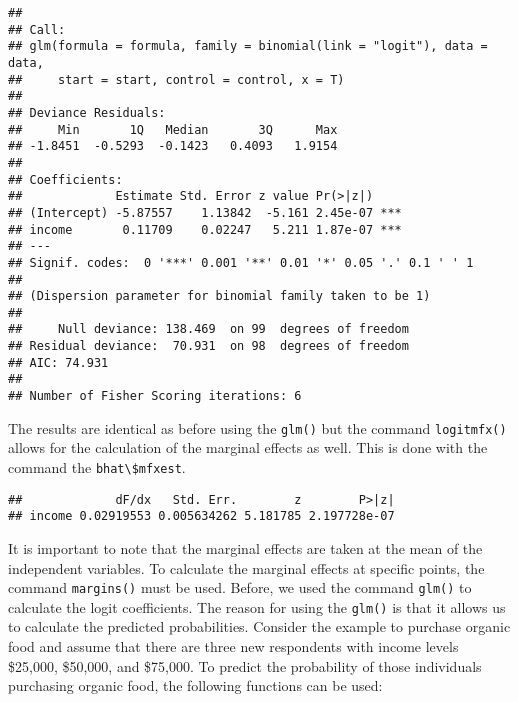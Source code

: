 \documentclass[
]{article}
\newenvironment{Shaded}{\begin{snugshade}}{\end{snugshade}}
\newcommand{\DataTypeTok}[1]{\textcolor[rgb]{0.13,0.29,0.53}{#1}}
\newcommand{\KeywordTok}[1]{\textcolor[rgb]{0.13,0.29,0.53}{\textbf{#1}}}
\newcommand{\NormalTok}[1]{#1}
\newcommand{\OperatorTok}[1]{\textcolor[rgb]{0.81,0.36,0.00}{\textbf{#1}}}
\newcommand{\StringTok}[1]{\textcolor[rgb]{0.31,0.60,0.02}{#1}}
\begin{document}
\begin{Shaded}
\end{Shaded}

\begin{verbatim}
## 
## Call:
## glm(formula = formula, family = binomial(link = "logit"), data = data, 
##     start = start, control = control, x = T)
## 
## Deviance Residuals: 
##     Min       1Q   Median       3Q      Max  
## -1.8451  -0.5293  -0.1423   0.4093   1.9154  
## 
## Coefficients:
##             Estimate Std. Error z value Pr(>|z|)    
## (Intercept) -5.87557    1.13842  -5.161 2.45e-07 ***
## income       0.11709    0.02247   5.211 1.87e-07 ***
## ---
## Signif. codes:  0 '***' 0.001 '**' 0.01 '*' 0.05 '.' 0.1 ' ' 1
## 
## (Dispersion parameter for binomial family taken to be 1)
## 
##     Null deviance: 138.469  on 99  degrees of freedom
## Residual deviance:  70.931  on 98  degrees of freedom
## AIC: 74.931
## 
## Number of Fisher Scoring iterations: 6
\end{verbatim}

The results are identical as before using the \texttt{glm()} but the command \texttt{logitmfx()} allows for the calculation of the marginal effects as well. This is done with the command the \texttt{bhat\textbackslash{}\$mfxest}.

\begin{Shaded}
\end{Shaded}

\begin{verbatim}
##             dF/dx   Std. Err.        z        P>|z|
## income 0.02919553 0.005634262 5.181785 2.197728e-07
\end{verbatim}

It is important to note that the marginal effects are taken at the mean of the independent variables. To calculate the marginal effects at specific points, the command \texttt{margins()} must be used. Before, we used the command \texttt{glm()} to calculate the logit coefficients. The reason for using the \texttt{glm()} is that it allows us to calculate the predicted probabilities. Consider the example to purchase organic food and assume that there are three new respondents with income levels \$25,000, \$50,000, and \$75,000. To predict the probability of those individuals purchasing organic food, the following functions can be used:
\end{document}
